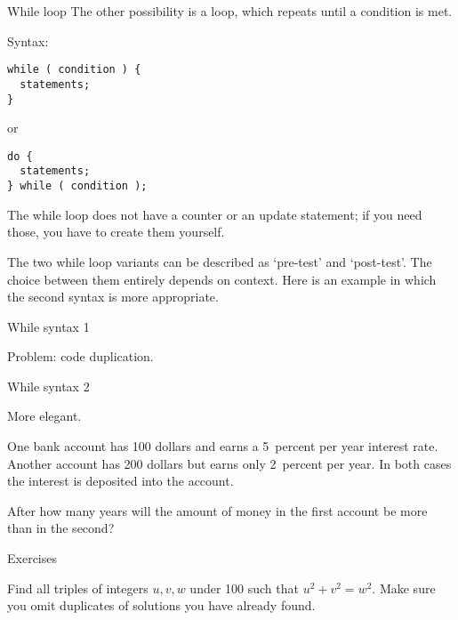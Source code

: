 \begin{block}{While loop}
  \label{sl:while}
  The other possibility is a  loop, which repeats until a
  condition is met.

  Syntax:
\begin{verbatim}
while ( condition ) {
  statements;
}
\end{verbatim}
or
\begin{verbatim}
do {
  statements;
} while ( condition );
\end{verbatim}
The while loop does not have a counter or an update statement; if you
need those, you have to create them yourself.
\end{block}

The two while loop variants can be described as `pre-test' and
`post-test'. The choice between them entirely depends on context. Here
is an example in which the second syntax is more appropriate.

\begin{block}{While syntax 1}
  \label{sl:while2}

  Problem: code duplication.
\end{block}

\begin{block}{While syntax 2}
  \label{sl:while3}

  More elegant.
\end{block}

\begin{exercise}
  \label{ex:interest}
  One bank account has 100 dollars and earns a 5~percent per year interest
  rate. Another account has 200 dollars but earns only 2~percent per
  year. In both cases the interest is deposited into the account.
  
  After how many years will the amount of money in the first account
  be more than in the second?
\end{exercise}

 {Exercises}

\begin{exercise}
  \label{ex:pythagoras}
  Find all triples of integers $u,v,w$ under 100 such that
  $u^2+v^2=w^2$. Make sure you omit duplicates of solutions you have
  already found.
\end{exercise}

